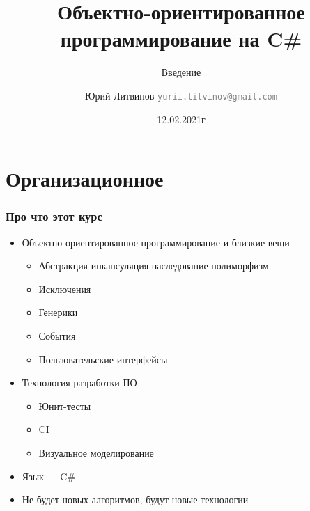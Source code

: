 \documentclass[xetex,mathserif,serif]{beamer}
\title{Объектно-ориентированное программирование на C\#}
\subtitle{Введение}
\author[Юрий Литвинов]{Юрий Литвинов \newline \textcolor{gray}{\small\texttt{yurii.litvinov@gmail.com}}}
\date{12.02.2021г}
\begin{document}
    
    \frame{\titlepage}

    \section{Организационное}

    \begin{frame}
        \frametitle{Про что этот курс}
        \begin{itemize}
            \item Объектно-ориентированное программирование и близкие вещи
            \begin{itemize}
                \item Абстракция-инкапсуляция-наследование-полиморфизм
                \item Исключения
                \item Генерики
                \item События
                \item Пользовательские интерфейсы
            \end{itemize}
            \item Технология разработки ПО
            \begin{itemize}
                \item Юнит-тесты
                \item CI
                \item Визуальное моделирование
            \end{itemize}
            \item Язык --- C\#
            \item Не будет новых алгоритмов, будут новые технологии
        \end{itemize}
    \end{frame}
\end{document}
